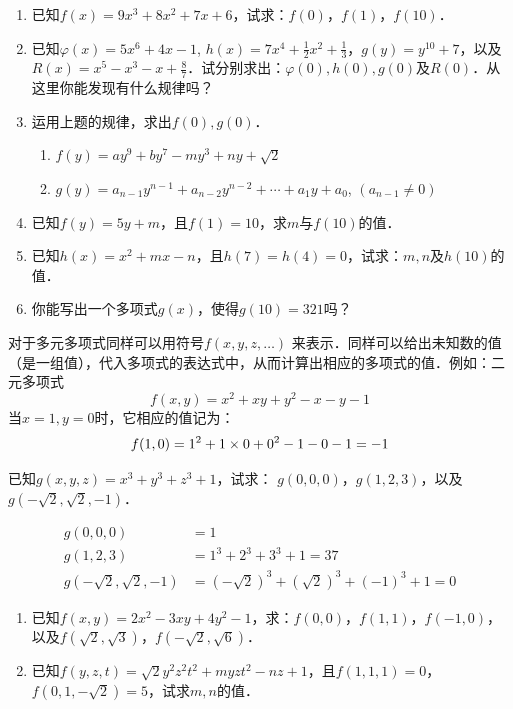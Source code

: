 \begin{ex}
    \begin{enumerate}
        \item 已知$f(x)=9x^3+8x^2+7x+6$，试求：$f(0)$，$f(1)$，$f(10)$．
        \item 已知$\varphi(x)=5x^6+4x-1$, $h(x)=7x^4+\frac{1}{2}x^2+\frac{1}{3}$，$g(y)=y^{10}+7$，以及$R(x)=x^5-x^3-x+\frac{8}{7}$．试分别求出：$\varphi(0), h(0), g(0)$及$R(0)$．从这里你能发现有什么规律吗？
        \item 运用上题的规律，求出$f(0),g(0)$．
        \begin{enumerate}
            \item $f(y)=ay^9+by^7-my^3+ny+\sqrt{2}$
            \item $g(y)=a_{n-1}y^{n-1}+a_{n-2}y^{n-2}+\cdots+a_1 y+a_0$, $(a_{n-1}\ne 0)$
        \end{enumerate}
        \item 已知$f(y)=5y+m$，且$f(1)=10$，求$m$与$f(10)$的值．
        \item 已知$h(x)=x^2+mx-n$，且$h(7)=h(4)=0$，试求：$m,n$及$h(10)$的值．
        \item 你能写出一个多项式$g(x)$，使得$g(10)=321$吗？
    \end{enumerate}
\end{ex}

对于多元多项式同样可以用符号$f(x,y,z,\ldots)$
来表示．同样可以给出未知数的值（是一组值），代入多项式的表达式中，从而计算出相应的多项式的值．例如：二元多项式$$f(x,y)=x^2+xy+y^2-x-y-1  $$
当$x=1,y=0$时，它相应的值记为：
$$f (1, 0) =1^2+1\times0+0^2-1-0-1=-1$$

\begin{example}
    已知$g(x,y,z)=x^3+y^3+z^3+1$，试求：
$g(0,0,0)$，$g(1,2,3)$，以及$g\left(-\sqrt{2},\sqrt{2},-1\right)$．
\end{example}

\begin{solution}
    \[\begin{split}
        g(0,0,0)&=1\\
        g(1,2,3)&=1^3+2^3+3^3+1=37\\
        g\left(-\sqrt{2},\sqrt{2},-1\right)&=\left(-\sqrt{2}\right)^3+\left(\sqrt{2}\right)^3+(-1)^3+1=0
    \end{split}\]
\end{solution}

\begin{ex}
    \begin{enumerate}
        \item 已知$f(x,y)=2x^2-3xy+4y^2-1$，求：$f(0,0)$，$f(1,1)$，$f(-1,0)$，以及$f(\sqrt{2},\sqrt{3})$，$f(-\sqrt{2},\sqrt{6})$．
        \item 已知$f(y,z,t)=\sqrt{2}y^2z^2t^2+myzt^2-nz+1$，且$f(1,1,1)=0$，$f(0,1,-\sqrt{2})=5$，试求$m,n$的值．
    \end{enumerate}
\end{ex}


